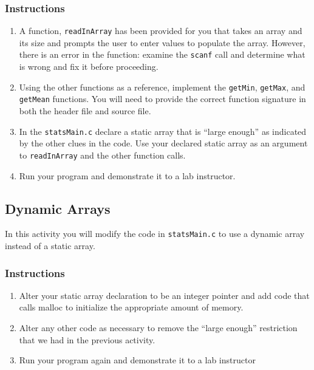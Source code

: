 \documentclass[12pt]{scrartcl}
\begin{document}
\subsubsection*{Instructions}

\begin{enumerate}
  \item A function, \texttt{readInArray} has been provided for you 
	that takes an array and its size and prompts the user to enter values 
	to populate the array.  However, there is an error in the function: 
	examine the \texttt{scanf} call and determine what is wrong 
	and fix it before proceeding.
  \item Using the other functions as a reference, implement the 
	\texttt{getMin}, \texttt{getMax}, and \texttt{getMean} 
	functions.  You will need to provide the correct function signature 
	in both the header file and source file.
  \item In the \texttt{statsMain.c} declare a static array that is 
	``large enough'' as indicated by the other clues in the code.  Use your 
	declared static array as an argument to \texttt{readInArray} 
	and the other function calls.
  \item Run your program and demonstrate it to a lab instructor.
\end{enumerate}

\subsection{Dynamic Arrays}

In this activity you will modify the code in \texttt{statsMain.c} to 
use a dynamic array instead of a static array.

\subsubsection*{Instructions}

\begin{enumerate}
  \item Alter your static array declaration to be an integer pointer and add 
	code that calls malloc to initialize the appropriate amount of memory.
  \item Alter any other code as necessary to remove the ``large enough'' 
	restriction that we had in the previous activity.
  \item Run your program again and demonstrate it to a lab instructor
\end{enumerate}
	
\end{document}
